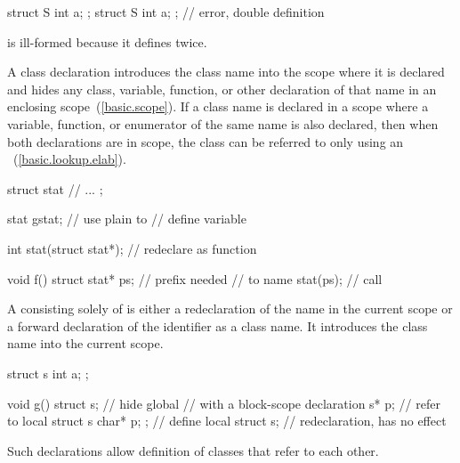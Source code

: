 \begin{codeblock}
struct S { int a; };
struct S { int a; };            // error, double definition
\end{codeblock}

is ill-formed because it defines  twice.
\exitexample

\pnum
{}%
%
A class declaration introduces the class name into the scope where
%
it is declared and hides any
class, variable, function, or other declaration of that name in an
enclosing scope~(\ref{basic.scope}). If a class name is declared in a
scope where a variable, function, or enumerator of the same name is also
declared, then when both declarations are in scope, the class can be
referred to only using an
~(\ref{basic.lookup.elab}).
\enterexample

\begin{codeblock}
struct stat {
  // ...
};

stat gstat;                     // use plain  to
                                // define variable

int stat(struct stat*);         // redeclare  as function

void f() {
  struct stat* ps;              //  prefix needed
                                // to name 
  stat(ps);                     // call 
}
\end{codeblock}
\exitexample
{}%
%
A  consisting solely of  is either a redeclaration of the name in the current scope
or a forward declaration of the identifier as a class name. It
introduces the class name into the current scope.
\enterexample

\begin{codeblock}
struct s { int a; };

void g() {
  struct s;                     // hide global 
                                // with a block-scope declaration
  s* p;                         // refer to local 
  struct s { char* p; };        // define local 
  struct s;                     // redeclaration, has no effect
}
\end{codeblock}
\exitexample
\enternote
Such declarations allow definition of classes that refer to each other.
%
\enterexample

